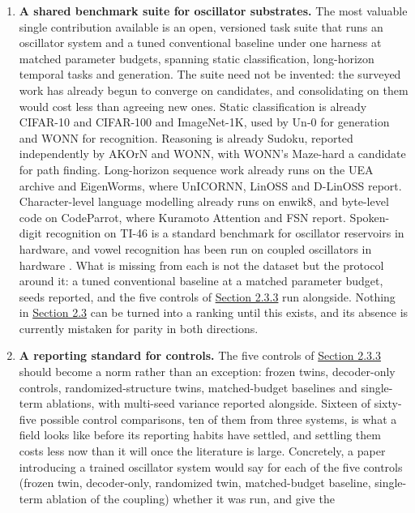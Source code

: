 \documentclass[10pt]{article}
\providecommand{\tightlist}{%
  \setlength{\itemsep}{0pt}\setlength{\parskip}{0pt}}
\begin{document}
\begin{enumerate}
\def\labelenumi{\arabic{enumi}.}
\tightlist
\item
  \textbf{A shared benchmark suite for oscillator substrates.} The most
  valuable single contribution available is an open, versioned task
  suite that runs an oscillator system and a tuned conventional baseline
  under one harness at matched parameter budgets, spanning static
  classification, long-horizon temporal tasks and generation. The suite
  need not be invented: the surveyed work has already begun to converge
  on candidates, and consolidating on them would cost less than agreeing
  new ones. Static classification is already CIFAR-10 and CIFAR-100 and
  ImageNet-1K, used by Un-0 for generation and WONN for recognition.
  Reasoning is already Sudoku, reported independently by AKOrN and WONN,
  with WONN's Maze-hard a candidate for path finding. Long-horizon
  sequence work already runs on the UEA archive and EigenWorms, where
  UnICORNN, LinOSS and D-LinOSS report. Character-level language
  modelling already runs on enwik8, and byte-level code on CodeParrot,
  where Kuramoto Attention and FSN report. Spoken-digit recognition on
  TI-46 is a standard benchmark for oscillator reservoirs in hardware,
  and vowel recognition has been run on coupled oscillators in hardware
  \citep{romera2018}. What is missing from each is not the dataset but
  the protocol around it: a tuned conventional baseline at a matched
  parameter budget, seeds reported, and the five controls of
  \hyperref[sec-2-3-3]{Section 2.3.3} run alongside. Nothing in
  \hyperref[sec-2-3]{Section 2.3} can be turned into a ranking until
  this exists, and its absence is currently mistaken for parity in both
  directions.
\item
  \textbf{A reporting standard for controls.} The five controls of
  \hyperref[sec-2-3-3]{Section 2.3.3} should become a norm rather than
  an exception: frozen twins, decoder-only controls,
  randomized-structure twins, matched-budget baselines and single-term
  ablations, with multi-seed variance reported alongside. Sixteen of
  sixty-five possible control comparisons, ten of them from three
  systems, is what a field looks like before its reporting habits have
  settled, and settling them costs less now than it will once the
  literature is large. Concretely, a paper introducing a trained
  oscillator system would say for each of the five controls (frozen
  twin, decoder-only, randomized twin, matched-budget baseline,
  single-term ablation of the coupling) whether it was run, and give the

\end{enumerate}
\end{document}
